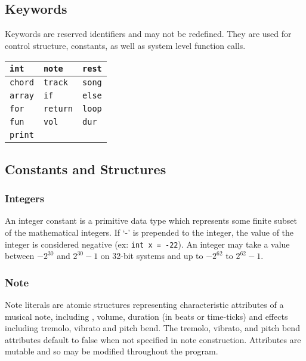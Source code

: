 \documentclass[letterpaper]{article}
\begin{document}
\begin{samepage}
\subsection{Keywords}
Keywords are reserved identifiers and may not be redefined. They are used for control structure, constants, as well as system level function calls.
\begin{table}[H]
\centering
\begin{tabularx}{.75\textwidth}{|X|X|X|}
\hline
\texttt{int} & \texttt{note} & \texttt{rest} \\
\hline
\texttt{chord} & \texttt{track} & \texttt{song} \\
\hline
\texttt{array} & \texttt{if} & \texttt{else} \\
\hline
\texttt{for} & \texttt{return} & \texttt{loop} \\
\hline
\texttt{fun} & \texttt{vol} & \texttt{dur} \\
\hline
\texttt{print} &  &  \\
\hline
\end{tabularx}
\end{table}
\end{samepage}

\subsection{Constants and Structures}
\subsubsection{Integers}
An integer constant is a primitive data type which represents some finite subset of the mathematical integers. If `-' is prepended to the integer, the value of the integer is considered negative (ex: \texttt{int x = -22}). An integer may take a value between $-2^{30}$ and $2^{30}-1$ on 32-bit systems and up to $-2^{62}$ to $2^{62}-1$.  

\subsubsection{Note}
Note literals are atomic structures representing characteristic attributes of a musical note, including 
, volume, duration (in beats or time-ticks) and effects including tremolo, vibrato and pitch bend. The tremolo, vibrato, and pitch bend attributes default to false when not specified in note construction. Attributes are mutable and so may be modified throughout the program. 
\end{document}
